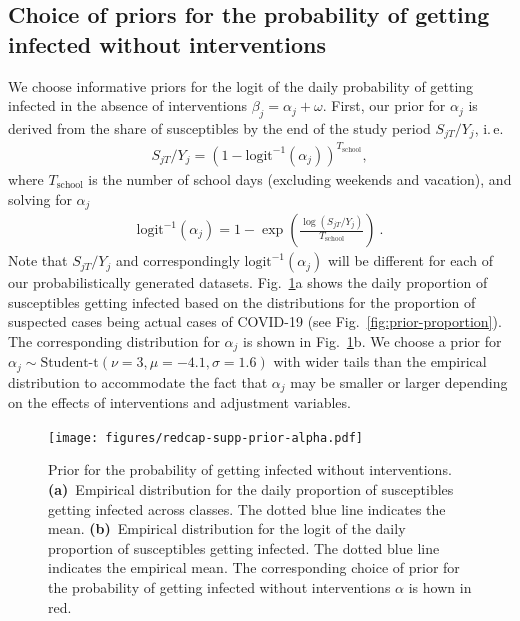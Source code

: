 \documentclass[fleqn,11pt]{wlscirep_supp}
\newcommand\ie{i.\,e.\xspace}
\begin{document}
\subsection{Choice of priors for the probability of getting infected without interventions}\label{subsec:prior-alpha}

We choose informative priors for the logit of the daily probability of getting infected in the absence of interventions $\beta_j = \alpha_j + \omega$. First, our prior for $\alpha_j$ is derived from the share of susceptibles by the end of the study period $S_{jT} / Y_j$, \ie 
\begin{align}
    S_{jT} / Y_j = (1 - \textrm{logit}^{-1}(\alpha_j))^{T_{\mathrm{school}}},
\end{align}
where $T_{\mathrm{school}}$ is the number of school days (excluding weekends and vacation), and solving for $\alpha_j$
\begin{align}
    \textrm{logit}^{-1}(\alpha_j) = 1 - \exp\left(\frac{\log(S_{jT} / Y_j)}{T_{\mathrm{school}}}\right) ~.
\end{align} 
Note that $S_{jT} / Y_j$ and correspondingly $\textrm{logit}^{-1}(\alpha_j)$ will be different for each of our probabilistically generated datasets. Fig.~\ref{fig:prior-alpha}a shows the daily proportion of susceptibles getting infected based on the distributions for the proportion of suspected cases being actual cases of COVID-19 (see Fig.~\ref{fig:prior-proportion}). The corresponding distribution for $\alpha_j$ is shown in Fig.~\ref{fig:prior-alpha}b. We choose a prior for $\alpha_j \sim \textrm{Student-t}(\nu = 3, \mu = -4.1, \sigma = 1.6)$ with wider tails than the empirical distribution to accommodate the fact that $\alpha_j$ may be smaller or larger depending on the effects of interventions and adjustment variables.

\begin{figure}[!htpb]
    \centering
    \texttt{[image: figures/redcap-supp-prior-alpha.pdf]}
    \caption[Prior for the probability of getting infected without interventions]{Prior for the probability of getting infected without interventions. \textbf{(a)}~Empirical distribution for the daily proportion of susceptibles getting infected across classes. The dotted blue line indicates the mean. \textbf{(b)}~Empirical distribution for the logit of the daily proportion of susceptibles getting infected. The dotted blue line indicates the empirical mean. The corresponding choice of prior for the probability of getting infected without interventions $\alpha$ is hown in red. }
    \label{fig:prior-alpha}
\end{figure}
\end{document}
